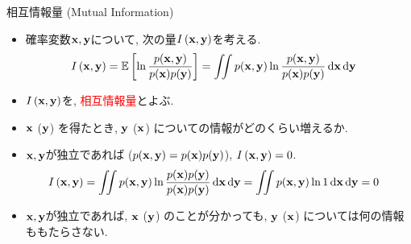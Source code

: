 \documentclass[dvipdfmx,notheorems,t]{beamer}
\begin{document}
\begin{frame}{相互情報量 (Mutual Information)}
\begin{itemize}
  \item 確率変数$\vb{x}, \vb{y}$について, 次の量$I \left( \vb{x}, \vb{y} \right)$を考える.
  \begin{align*}
    I \left( \vb{x}, \vb{y} \right) &= \operatorname{\mathbb{E}} \left[ \ln \frac{p(\vb{x}, \vb{y})}{p(\vb{x}) p(\vb{y})} \right]
      = \iint p(\vb{x}, \vb{y}) \ln \frac{p(\vb{x}, \vb{y})}{p(\vb{x}) p(\vb{y})} \dd{\vb{x}} \dd{\vb{y}}
  \end{align*}
  \item $I \left( \vb{x}, \vb{y} \right)$を, \textcolor{red}{相互情報量}とよぶ.
  \item $\vb{x}$ ($\vb{y}$) を得たとき, $\vb{y}$ ($\vb{x}$) についての情報がどのくらい増えるか.
  \item $\vb{x}, \vb{y}$が独立であれば ($p(\vb{x}, \vb{y}) = p(\vb{x}) p(\vb{y})$), $I \left( \vb{x}, \vb{y} \right) = 0$.
  \begin{align*}
    I \left( \vb{x}, \vb{y} \right)
      &= \iint p(\vb{x}, \vb{y}) \ln \frac{p(\vb{x}) p(\vb{y})}{p(\vb{x}) p(\vb{y})} \dd{\vb{x}} \dd{\vb{y}}
      = \iint p(\vb{x}, \vb{y}) \ln 1 \dd{\vb{x}} \dd{\vb{y}} = 0
  \end{align*}
  \item $\vb{x}, \vb{y}$が独立であれば, $\vb{x}$ ($\vb{y}$) のことが分かっても,
  $\vb{y}$ ($\vb{x}$) については何の情報ももたらさない.
\end{itemize}
\end{frame}
\end{document}
